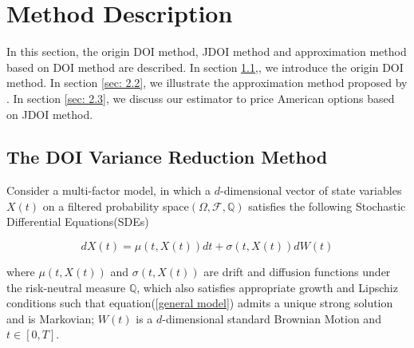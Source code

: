\chapter{Method Description}

In this section, the origin DOI method, JDOI method and approximation method based on DOI method are described. In section \ref{sec: 2.1},, we introduce the origin DOI method. In section \ref{sec: 2.2}, we illustrate the approximation method proposed by \cite{kristensen_adding_2011}. In section \ref{sec: 2.3}, we discuss our estimator to price American options based on JDOI method.

\section{The DOI Variance Reduction Method}
\label{sec: 2.1}

Consider a multi-factor model, in which a $d$-dimensional vector of state variables $X(t)$ on a filtered probability space$(\Omega,\mathcal F, \mathbb Q)$ satisfies the following Stochastic Differential Equations(SDEs)

\begin{equation}\label{general model}
    dX(t) = \mu(t, X(t)) dt + \sigma(t, X(t)) dW(t)
\end{equation}

\noindent where $\mu(t,X(t))$ and $\sigma(t, X(t))$ are drift and diffusion functions under the risk-neutral measure $\mathbb Q$, which also satisfies appropriate growth and Lipschiz conditions such that equation(\ref{general model}) admits a unique strong solution and is Markovian; $W(t)$ is a $d$-dimensional standard Brownian Motion and $t \in [0,T]$.





